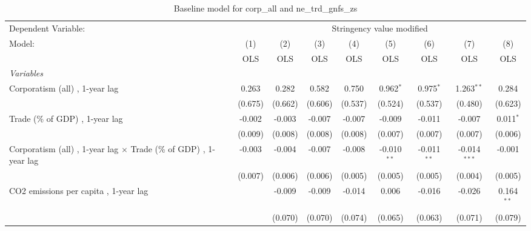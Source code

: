 
\begin{table}[htbp]
   \caption{Baseline model for corp\_all and ne\_trd\_gnfs\_zs}
   \centering
   \begin{tabular}{lcccccccc}
      \toprule
      Dependent Variable: & \multicolumn{8}{c}{Stringency value modified}\\
      Model:                                                                   & (1)     & (2)     & (3)         & (4)         & (5)           & (6)           & (7)            & (8)\\  
                                                                               &  OLS    & OLS     & OLS         & OLS         & OLS           & OLS           & OLS            & OLS\\  
      \midrule
      \emph{Variables}\\
      Corporatism (all) , 1-year lag                                           & 0.263   & 0.282   & 0.582       & 0.750       & 0.962$^{*}$   & 0.975$^{*}$   & 1.263$^{**}$   & 0.284\\   
                                                                               & (0.675) & (0.662) & (0.606)     & (0.537)     & (0.524)       & (0.537)       & (0.480)        & (0.623)\\   
      Trade (\% of GDP) , 1-year lag                                           & -0.002  & -0.003  & -0.007      & -0.007      & -0.009        & -0.011        & -0.007         & 0.011$^{*}$\\   
                                                                               & (0.009) & (0.008) & (0.008)     & (0.008)     & (0.007)       & (0.007)       & (0.007)        & (0.006)\\   
      Corporatism (all) , 1-year lag $\times$ Trade (\% of GDP) , 1-year lag   & -0.003  & -0.004  & -0.007      & -0.008      & -0.010$^{**}$ & -0.011$^{**}$ & -0.014$^{***}$ & -0.001\\   
                                                                               & (0.007) & (0.006) & (0.006)     & (0.005)     & (0.005)       & (0.005)       & (0.004)        & (0.005)\\   
      CO2 emissions per capita , 1-year lag                                    &         & -0.009  & -0.009      & -0.014      & 0.006         & -0.016        & -0.026         & 0.164$^{**}$\\   
                                                                               &         & (0.070) & (0.070)     & (0.074)     & (0.065)       & (0.063)       & (0.071)        & (0.079)\\   

\end{tabular}
\end{table}
